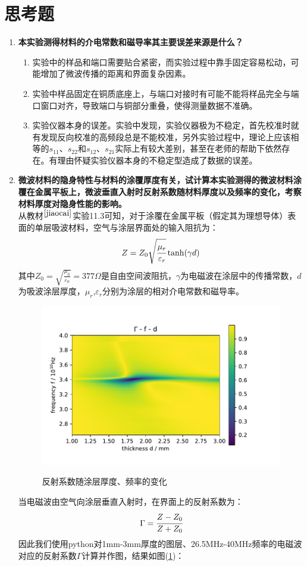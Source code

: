 \documentclass[a4paper]{article}
\begin{document}
\section{思考题}
\begin{enumerate}
\item \textbf{本实验测得材料的介电常数和磁导率其主要误差来源是什么？}
\begin{enumerate}
\item 实验中的样品和端口需要贴合紧密，而实验过程中靠手固定容易松动，可能增加了微波传播的距离和界面复杂因素。
\item 实验中样品固定在铜质底座上，与端口对接时有可能不能将样品完全与端口窗口对齐，导致端口与铜部分重叠，使得测量数据不准确。
\item 实验仪器本身的误差。实验中发现，实验仪器极为不稳定，首先校准时就有发现反向校准的高频段总是不能校准，另外实验过程中，理论上应该相等的$s_{11}$、$s_{22}$和$s_{12}$、$s_{21}$实际上有较大差别，甚至在老师的帮助下依然存在。有理由怀疑实验仪器本身的不稳定型造成了数据的误差。
\end{enumerate}
\item \textbf{微波材料的隐身特性与材料的涂覆厚度有关，试计算本实验测得的微波材料涂覆在金属平板上，微波垂直入射时反射系数随材料厚度以及频率的变化，考察材料厚度对隐身性能的影响。}\\
从教材$^{\cite{jiaocai}}$实验11.3可知，对于涂覆在金属平板（假定其为理想导体）表面的单层吸波材料，空气与涂层界面处的输入阻抗为：
\begin{equation}
Z = Z_0\sqrt{\cfrac{\mu_r}{\varepsilon_r}}\tanh(\gamma d)
\end{equation}
其中$Z_0 = \sqrt{\frac{\mu_0}{\varepsilon_0}} = 377\Omega$是自由空间波阻抗，$\gamma$为电磁波在涂层中的传播常数，$d$为吸波涂层厚度，$\mu_r$,$\varepsilon_r$分别为涂层的相对介电常数和磁导率。
\begin{figure}[H]
\centering
\includegraphics[width=12cm]{fig/skt.pdf}\\
\caption{反射系数随涂层厚度、频率的变化}\label{skt}
\end{figure}
当电磁波由空气向涂层垂直入射时，在界面上的反射系数为：
\begin{equation}
\Gamma = \cfrac{Z-Z_0}{Z+Z_0}
\end{equation}
因此我们使用python对1mm-3mm厚度的图层、26.5MHz-40MHz频率的电磁波对应的反射系数$\Gamma$计算并作图，结果如图(\ref{skt})：
\end{enumerate}

\nocite{jiaocai}

\end{document}
